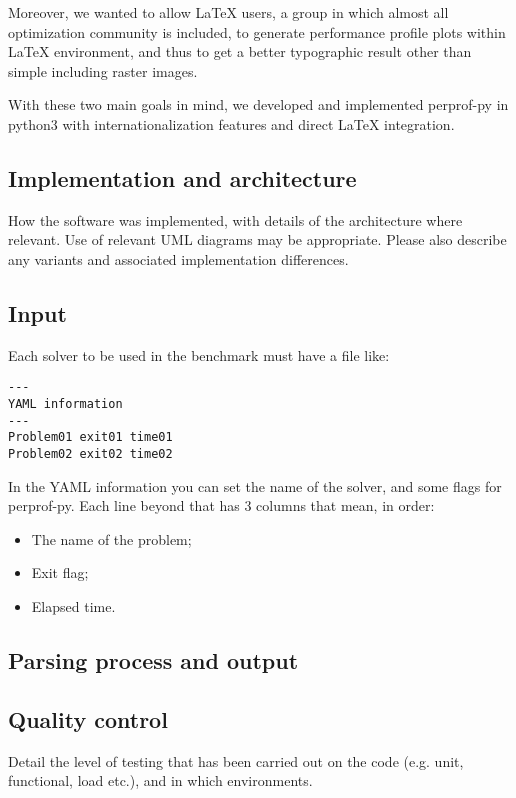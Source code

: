 \documentclass[10pt,a4paper]{article}
\begin{document}
    Moreover,  we wanted to allow LaTeX users, a group in which almost all
    optimization community is included,  to   generate performance profile plots
    within LaTeX environment, and thus to get a better typographic result other
    than simple including raster  images.

    With these two main goals in mind, we developed and implemented perprof-py
    in python3 with internationalization features and direct LaTeX integration.

\subsection*{Implementation and architecture}

    How the software was implemented, with details of the architecture where
    relevant. Use of relevant UML diagrams may be appropriate. Please also
    describe any variants and associated implementation differences.

\subsection*{Input}

    Each solver to be used in the benchmark must have a file like:

    \begin{verbatim}
---
YAML information
---
Problem01 exit01 time01
Problem02 exit02 time02
    \end{verbatim}

    In the YAML information you can set the name of the solver, and some
    flags for perprof-py.
    Each line beyond that has 3 columns that mean, in order:
    \begin{itemize}
      \item The name of the problem;
      \item Exit flag;
      \item Elapsed time.
    \end{itemize}

\subsection*{Parsing process and output}

\subsection*{Quality control}

    Detail the level of testing that has been carried out on the code (e.g.
    unit, functional, load etc.), and in which environments.
\end{document}
